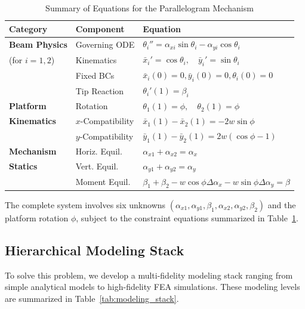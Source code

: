 \documentclass[colorlinks,upint,subscriptcorrection,varvw,hyphenate,balance]{asmeconf} %
\newcommand{\xbar}{\bar{x}}
\newcommand{\ybar}{\bar{y}}
\begin{document}
\begin{table}[t]
\centering
\caption{Summary of Equations for the Parallelogram Mechanism}
\label{tab:constraints}
\begin{tabular}{lll}
\toprule
\textbf{Category} & \textbf{Component} & \textbf{Equation} \\
\midrule
\textbf{Beam Physics} & Governing ODE & $\theta_i'' = \alpha_{xi} \sin\theta_i - \alpha_{yi} \cos\theta_i$ \\
(for $i=1, 2$) & Kinematics & $\xbar_i' = \cos\theta_i, \quad \ybar_i' = \sin\theta_i$ \\
& Fixed BCs & $\xbar_i(0)=0, \ybar_i(0)=0, \theta_i(0)=0$ \\
& Tip Reaction & $\theta_i'(1) = \beta_i$ \\
\midrule
\textbf{Platform} & Rotation & $\theta_1(1) = \phi, \quad \theta_2(1) = \phi$ \\
\textbf{Kinematics} & $x$-Compatibility & $\xbar_1(1) - \xbar_2(1) = -2w\sin\phi$ \\
& $y$-Compatibility & $\ybar_1(1) - \ybar_2(1) = 2w(\cos\phi - 1)$ \\
\midrule
\textbf{Mechanism} & Horiz. Equil. & $\alpha_{x1} + \alpha_{x2} = \alpha_x$ \\
\textbf{Statics} & Vert. Equil. & $\alpha_{y1} + \alpha_{y2} = \alpha_y$ \\
& Moment Equil. & $\beta_1 + \beta_2 - w\cos\phi \Delta\alpha_x - w\sin\phi \Delta\alpha_y = \beta$ \\
\bottomrule
\end{tabular}
\end{table}

The complete system involves six unknowns $(\alpha_{x1}, \alpha_{y1}, \beta_1, \alpha_{x2}, \alpha_{y2}, \beta_2)$ and the platform rotation $\phi$, subject to the constraint equations summarized in Table~\ref{tab:constraints}.

\subsection{Hierarchical Modeling Stack}
To solve this problem, we develop a multi-fidelity modeling stack ranging from simple analytical models to high-fidelity FEA simulations. These modeling levels are summarized in Table~\ref{tab:modeling_stack}.
\end{document}
